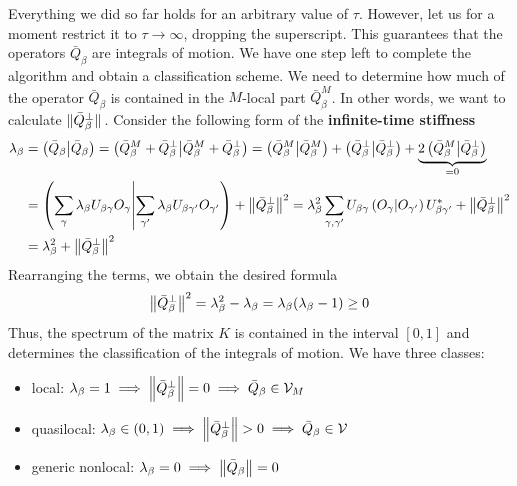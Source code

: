 Everything we did so far holds for an
arbitrary value of \(\tau\). However, let us for a moment restrict it to \(\tau\to \infty\), dropping the superscript.
This guarantees that the operators \(\bar{Q} _{\beta}\) are integrals of motion.
We have one step left to complete the algorithm and obtain a classification scheme.
We need to determine how much of the operator \(\bar{Q} _{\beta }\) is contained in the
\(M\)-local part \(\bar{Q} _{\beta}^M\). In other words, we want to calculate \(\norm*{\bar{Q} _{\beta}^{\perp}}\).
Consider the following form of the \textbf{infinite-time stiffness} 
\begin{align}
  \lambda_{\beta} & = \left(\bar{Q} _{\beta} \middle| \bar{Q} _{\beta}\right) = \left(\bar{Q} _{\beta}^M + \bar{Q} _{\beta}^{\perp} \middle| \bar{Q} _{\beta}^M + \bar{Q} _{\beta}^{\perp}\right) = \left(\bar{Q} _{\beta}^M \middle| \bar{Q} _{\beta}^M\right) +
  \left(\bar{Q} _{\beta}^{\perp} \middle| \bar{Q} _{\beta}^{\perp}\right) + \underbrace{2 \left(\bar{Q} _{\beta}^M \middle| \bar{Q}_{\beta}^{\perp}\right)}_{=0} \nonumber                                                                        \\
                  & = \left(\sum_{\gamma} \lambda_{\beta} U_{\beta\gamma} O_{\gamma} \middle| \sum_{\gamma^{\prime}} \lambda_{\beta} U_{\beta\gamma^{\prime}} O_{\gamma^{\prime}}\right) + \norm{\bar{Q} _{\beta}^{\perp}}^2 =
  \lambda_{\beta}^2 \sum_{\gamma,\gamma^{\prime}} U_{\beta\gamma} \left(O_{\gamma} \middle| O_{\gamma^{\prime}}\right) U_{\beta\gamma^{\prime}}^{\ast} + \norm{\bar{Q} _{\beta}^{\perp}}^2  \nonumber                             \\
                  & =\lambda_{\beta}^2 + \norm{\bar{Q} _{\beta}^{\perp}}^2
\end{align}
Rearranging the terms, we obtain the desired formula
\begin{equation}
  \norm{\bar{Q}_{\beta}^{\perp}}^2 = \lambda_{\beta}^2 - \lambda_{\beta} = \lambda_{\beta} (\lambda_{\beta} - 1) \geq 0
  \label{eq:liom_norm}
\end{equation}
Thus, the spectrum of the matrix \(K\) is contained in the interval \([0,1]\) and
determines the classification of the integrals of motion. We have three classes:
\begin{itemize}
  \item local: \(\lambda_{\beta} = 1 \implies \norm{\bar{Q} _{\beta}^{\perp}} = 0 \implies \bar{Q}_{\beta} \in \mathcal{V}_M\)
  \item quasilocal: \(\lambda_{\beta} \in \left(0,1\right) \implies \norm{\bar{Q} _{\beta}^{\perp}} > 0 \implies \bar{Q} _{\beta} \in \mathcal{V} \)
  \item generic nonlocal: \(\lambda_{\beta} = 0 \implies \norm{\bar{Q} _{\beta}} = 0\)
\end{itemize}
